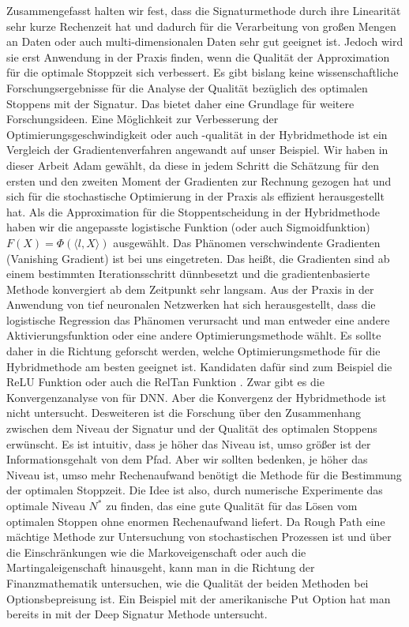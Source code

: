 \documentclass[12pt,titlepage,headsepline]{article}
\begin{document}
        \hfill\break
        Zusammengefasst halten wir fest, dass die Signaturmethode durch ihre Linearität sehr kurze Rechenzeit hat und dadurch für die Verarbeitung von großen Mengen an Daten oder auch multi-dimensionalen Daten sehr gut geeignet ist. Jedoch wird sie erst Anwendung in der Praxis finden, wenn die Qualität der Approximation für die optimale Stoppzeit sich verbessert. Es gibt bislang keine wissenschaftliche Forschungsergebnisse für die Analyse der Qualität bezüglich des optimalen Stoppens mit der Signatur. Das bietet daher eine Grundlage für weitere Forschungsideen.
        \hfill\break
        Eine Möglichkeit zur Verbesserung der Optimierungsgeschwindigkeit oder auch -qualität in der Hybridmethode ist ein Vergleich der Gradientenverfahren angewandt auf unser Beispiel. Wir haben in dieser Arbeit Adam gewählt, da diese in jedem Schritt die Schätzung für den ersten und den zweiten Moment der Gradienten zur Rechnung gezogen hat und sich für die stochastische Optimierung in der Praxis als effizient herausgestellt hat. Als die Approximation für die Stoppentscheidung in der Hybridmethode haben wir die angepasste logistische Funktion (oder auch Sigmoidfunktion) $F(X)=\Phi(\langle l, X \rangle)$ ausgewählt. Das Phänomen verschwindente Gradienten (Vanishing Gradient) ist bei uns eingetreten. Das heißt, die Gradienten sind ab einem bestimmten Iterationsschritt dünnbesetzt und die gradientenbasierte Methode konvergiert ab dem Zeitpunkt sehr langsam. Aus der Praxis in der Anwendung von tief neuronalen Netzwerken hat sich herausgestellt, dass die logistische Regression das Phänomen verursacht und man entweder eine andere Aktivierungsfunktion oder eine andere Optimierungsmethode wählt. Es sollte daher in die Richtung geforscht werden, welche Optimierungsmethode für die Hybridmethode am besten geeignet ist. Kandidaten dafür sind zum Beispiel die ReLU Funktion oder auch die RelTan Funktion \cite{wang_reltanh_2019}.
        \hfill\break
        Zwar gibt es die Konvergenzanalyse von \cite{becker_deep_2019} für DNN. Aber die Konvergenz der Hybridmethode ist nicht untersucht. Desweiteren ist die Forschung über den Zusammenhang zwischen dem Niveau der Signatur und der Qualität des optimalen Stoppens erwünscht. Es ist intuitiv, dass je höher das Niveau ist, umso größer ist der Informationsgehalt von dem Pfad. Aber wir sollten bedenken, je höher das Niveau ist, umso mehr Rechenaufwand benötigt die Methode für die Bestimmung der optimalen Stoppzeit. Die Idee ist also, durch numerische Experimente das optimale Niveau $N^*$ zu finden, das eine gute Qualität für das Lösen vom optimalen Stoppen ohne enormen Rechenaufwand liefert.
        \hfill\break
        Da Rough Path eine mächtige Methode zur Untersuchung von stochastischen Prozessen ist und über die Einschränkungen wie die Markoveigenschaft oder auch die Martingaleigenschaft hinausgeht, kann man in die Richtung der Finanzmathematik untersuchen, wie die Qualität der beiden Methoden bei Optionsbepreisung ist. Ein Beispiel mit der amerikanische Put Option hat man bereits in \cite{bayer_optimal_2020} mit der Deep Signatur Methode untersucht.
\end{document}
